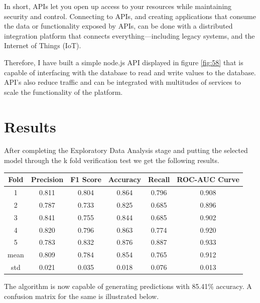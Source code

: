 \documentclass[12pt]{article}
\begin{document}
In short, APIs let you open up access to your resources while maintaining security and control. Connecting to APIs, and creating applications that consume the data or functionality exposed by APIs, can be done with a distributed integration platform that connects everything—including legacy systems, and the Internet of Things (IoT).\cite{redhat}

Therefore, I have built a simple node.js API displayed in figure \ref{fig:58} that is capable of interfacing with the database to read and write values to the database. API's also reduce traffic and can be integrated with multitudes of services to scale the functionality of the platform.









\clearpage
\newpage
\section{Results}
After completing the Exploratory Data Analysis stage and putting the selected model through the k fold verification test we get the following results.

{
\centering
\begin{table}[ht]
\centering
\begin{tabular}{|c|c|c|c|c|c|}
\hline
Fold & Precision & F1 Score & Accuracy & Recall & ROC-AUC Curve \\ \hline
1    & 0.811     & 0.804    & 0.864    & 0.796  & 0.908         \\ \hline
2    & 0.787     & 0.733    & 0.825    & 0.685  & 0.896         \\ \hline
3    & 0.841     & 0.755    & 0.844    & 0.685  & 0.902         \\ \hline
4    & 0.820     & 0.796    & 0.863    & 0.774  & 0.920         \\ \hline
5    & 0.783     & 0.832    & 0.876    & 0.887  & 0.933         \\ \hline
mean & 0.809     & 0.784    & 0.854    & 0.765  & 0.912         \\ \hline
std  & 0.021     & 0.035    & 0.018    & 0.076  & 0.013         \\ \hline
\end{tabular}
\label{table:7}
\end{table}
}

The algorithm is now capable of generating predictions with 85.41\% accuracy. A confusion matrix for the same is illustrated below.
\end{document}
